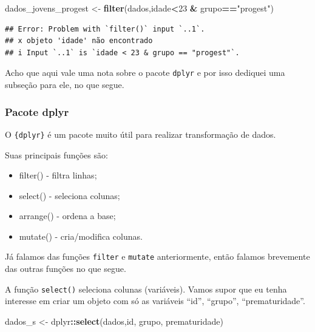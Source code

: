 \documentclass[
]{book}
\newenvironment{Shaded}{\begin{snugshade}}{\end{snugshade}}
\newcommand{\DecValTok}[1]{\textcolor[rgb]{0.00,0.00,0.81}{#1}}
\newcommand{\KeywordTok}[1]{\textcolor[rgb]{0.13,0.29,0.53}{\textbf{#1}}}
\newcommand{\NormalTok}[1]{#1}
\newcommand{\OperatorTok}[1]{\textcolor[rgb]{0.81,0.36,0.00}{\textbf{#1}}}
\newcommand{\StringTok}[1]{\textcolor[rgb]{0.31,0.60,0.02}{#1}}
\begin{document}
\begin{Shaded}
\begin{Highlighting}[]
\NormalTok{dados_jovens_progest <-}\StringTok{  }\KeywordTok{filter}\NormalTok{(dados,idade}\OperatorTok{<}\DecValTok{23} \OperatorTok{&}\StringTok{ }\NormalTok{grupo}\OperatorTok{==}\StringTok{"progest"}\NormalTok{)}
\end{Highlighting}
\end{Shaded}

\begin{verbatim}
## Error: Problem with `filter()` input `..1`.
## x objeto 'idade' não encontrado
## i Input `..1` is `idade < 23 & grupo == "progest"`.
\end{verbatim}

Acho que aqui vale uma nota sobre o pacote \texttt{dplyr} e por isso dediquei uma subseção para ele, no que segue.

\hypertarget{pacote-dplyr}{%
\subsubsection{Pacote dplyr}\label{pacote-dplyr}}

O \texttt{\{dplyr\}} é um pacote muito útil para realizar transformação de dados.

Suas principais funções são:

\begin{itemize}
\item
  filter() - filtra linhas;
\item
  select() - seleciona colunas;
\item
  arrange() - ordena a base;
\item
  mutate() - cria/modifica colunas.
\end{itemize}

Já falamos das funções \texttt{filter} e \texttt{mutate} anteriormente, então falamos brevemente das outras funções no que segue.

A função \texttt{select()} seleciona colunas (variáveis). Vamos supor que eu tenha interesse em criar um objeto com só as variáveis ``id'', ``grupo'', ``prematuridade''.

\begin{Shaded}
\begin{Highlighting}[]
\NormalTok{dados_s <-}\StringTok{ }\NormalTok{dplyr}\OperatorTok{::}\KeywordTok{select}\NormalTok{(dados,id, grupo, prematuridade)}
\end{Highlighting}
\end{Shaded}
\end{document}
